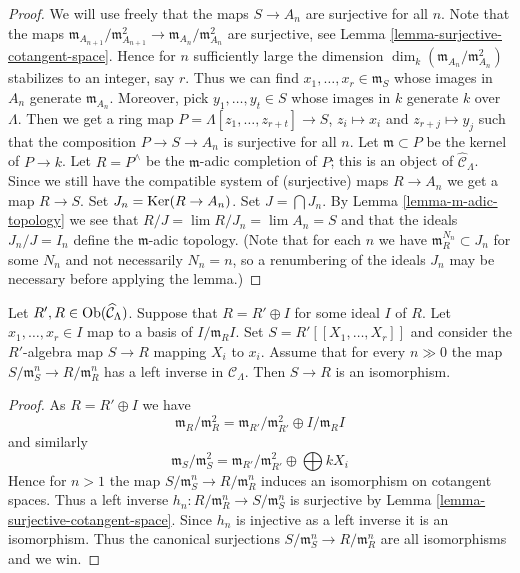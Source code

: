 \begin{proof}
We will use freely that the maps $S \to A_n$ are surjective for all $n$.
Note that the maps
$\mathfrak m_{A_{n + 1}}/\mathfrak m_{A_{n + 1}}^2 \to
\mathfrak m_{A_n}/\mathfrak m_{A_n}^2$ are surjective, see
Lemma \ref{lemma-surjective-cotangent-space}.
Hence for $n$ sufficiently large the dimension
$\dim_k (\mathfrak m_{A_n}/\mathfrak m_{A_n}^2)$ stabilizes to an
integer, say $r$.
Thus we can find $x_1, \ldots, x_r \in \mathfrak m_S$ whose images in
$A_n$ generate $\mathfrak m_{A_n}$. Moreover, pick $y_1, \ldots, y_t \in S$
whose images in $k$ generate $k$ over $\Lambda$. Then we get a ring map
$P = \Lambda[z_1, \ldots, z_{r + t}] \to S$, $z_i \mapsto x_i$ and
$z_{r + j} \mapsto y_j$ such that the composition
$P \to S \to A_n$ is surjective for all $n$. Let $\mathfrak m \subset P$
be the kernel of $P \to k$. Let $R = P^\wedge$ be the $\mathfrak m$-adic
completion of $P$; this is an object of $\widehat{\mathcal{C}}_\Lambda$.
Since we still have the compatible system of (surjective) maps $R \to A_n$
we get a map $R \to S$. Set $J_n = \mathop{\mathrm{Ker}}(R \to A_n)$.
Set $J = \bigcap J_n$. By
Lemma \ref{lemma-m-adic-topology}
we see that $R/J = \lim R/J_n = \lim A_n = S$
and that the ideals $J_n/J = I_n$ define the $\mathfrak m$-adic topology.
(Note that for each $n$ we have $\mathfrak m_R^{N_n} \subset J_n$ for
some $N_n$ and not necessarily $N_n = n$, so a renumbering of the ideals
$J_n$ may be necessary before applying the lemma.)
\end{proof}

\begin{lemma}
\label{lemma-power-series}
Let $R', R \in \mathop{\mathrm{Ob}}\nolimits(\widehat{\mathcal{C}}_\Lambda)$. Suppose that
$R = R' \oplus I$ for some ideal $I$ of $R$. Let $x_1, \ldots, x_r \in I$
map to a basis of $I/\mathfrak m_R I$. Set $S = R'[[X_1, \ldots, X_r]]$
and consider the $R'$-algebra map $S \to R$ mapping $X_i$ to $x_i$.
Assume that for every $n \gg 0$ the map
$S/\mathfrak m_S^n \to R/\mathfrak m_R^n$ has a left inverse in
$\mathcal{C}_\Lambda$. Then $S \to R$ is an isomorphism.
\end{lemma}

\begin{proof}
As $R = R' \oplus I$ we have
$$
\mathfrak m_R/\mathfrak m_R^2 =
\mathfrak m_{R'}/\mathfrak m_{R'}^2 \oplus I/\mathfrak m_RI
$$
and similarly
$$
\mathfrak m_S/\mathfrak m_S^2 =
\mathfrak m_{R'}/\mathfrak m_{R'}^2 \oplus \bigoplus kX_i
$$
Hence for $n > 1$ the map $S/\mathfrak m_S^n \to R/\mathfrak m_R^n$
induces an isomorphism on cotangent spaces. Thus a left inverse
$h_n : R/\mathfrak m_R^n \to S/\mathfrak m_S^n$ is surjective by
Lemma \ref{lemma-surjective-cotangent-space}.
Since $h_n$ is injective as a left inverse it is an isomorphism.
Thus the canonical surjections $S/\mathfrak m_S^n \to R/\mathfrak m_R^n$
are all isomorphisms and we win.
\end{proof}




